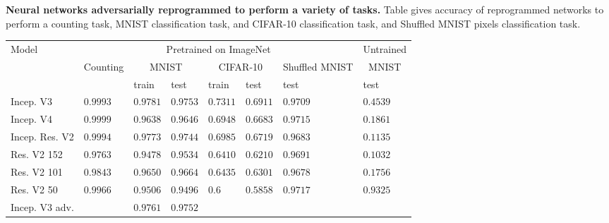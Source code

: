 \documentclass{article}
\newcommand{\jcom}[1]{{\textcolor{darkgreen}{[Jascha: #1]}}}
\begin{document}
  \caption{{\bf Neural networks adversarially reprogrammed to perform a variety of tasks.}
  Table gives accuracy of reprogrammed networks to perform a counting task, MNIST classification task, and CIFAR-10 classification task, and Shuffled MNIST pixels classification task.}
  \label{table: reprogramming results}
  \centering
  \begin{tabular}{llllllll}
    \toprule
       Model &  \multicolumn{6}{c}{Pretrained on ImageNet}   & \multicolumn{1}{c}{Untrained}       \\
        \cmidrule(r){2-7}
        \cmidrule(r){8-8}

   &Counting &  \multicolumn{2}{c}{MNIST}     &       \multicolumn{2}{c}{CIFAR-10}     & \multicolumn{1}{c}{Shuffled MNIST}  & \multicolumn{1}{c}{MNIST}       \\
        \cmidrule(r){3-4}
        \cmidrule(r){5-6}
        \cmidrule(r){7-7}
        \cmidrule(r){8-8}

           &  & train &  test & train & test  &test  &test  \\
    \midrule
    Incep. V3                 &  $0.9993$  &   $0.9781$    & $0.9753$    & $0.7311$  & $0.6911$  & $0.9709$ & $0.4539$  \\
    Incep. V4                 & $0.9999$   &    $0.9638$  & $0.9646$   &  $0.6948$   & $0.6683$& $0.9715$ & $0.1861$  \\
    Incep. Res. V2    & $0.9994$   &   $0.9773$  & $0.9744$    &  $0.6985$ & $0.6719$ & $0.9683$ & $0.1135$  \\
    Res. V2 152             &  $0.9763$  &    $0.9478$ &$0.9534$   &  $0.6410$ & $0.6210$ & $0.9691$ & $0.1032$ \\
    Res. V2 101             &  $0.9843$  &  $0.9650$  & $0.9664$  & $0.6435$  & $0.6301$ & $0.9678$ & $0.1756$ \\
    Res. V2 50             &  $0.9966$  &  $0.9506$  & $0.9496$  & $0.6$  & $0.5858$ & $0.9717$ &  $0.9325$ \\
    Incep. V3 adv.          &     &   $0.9761$    & $0.9752$    &   &  & & \\
    \bottomrule
  \end{tabular}
\end{document}
